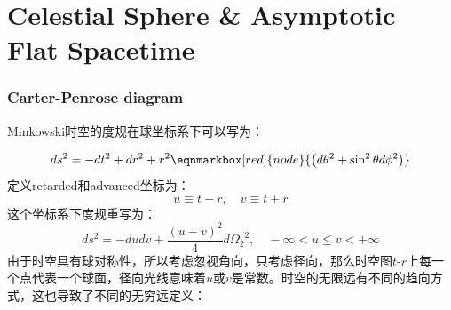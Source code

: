 \part{Celestial Sphere \&  Asymptotic Flat Spacetime}
\setcounter{theorem}{0}
\setcounter{definition}{0}
\setcounter{lemma}{0}
\setcounter{sidenote}{1}

\section{Carter-Penrose diagram}
Minkowski时空的度规在球坐标系下可以写为：

\begin{equation}
	ds^2=-dt^2+dr^2+r^2\eqnmarkbox[red]{node}{\left(d\theta^2+\sin^2\theta d\phi^2\right)}
\end{equation}
定义retarded和advanced坐标为：
\begin{equation}
	u\equiv t-r,\quad v\equiv t+r
\end{equation}
这个坐标系下度规重写为：
\begin{equation}
	ds^2=-dudv+\frac{(u-v)^2}{4}d{\Omega_2}^2,\quad -\infty<u\leq v <+\infty
\end{equation}
由于时空具有球对称性，所以考虑忽视角向，只考虑径向，那么时空图$t\mbox{-}r$上每一个点代表一个球面，径向光线意味着$u$或$v$是常数。时空的无限远有不同的趋向方式，这也导致了不同的无穷远定义：
